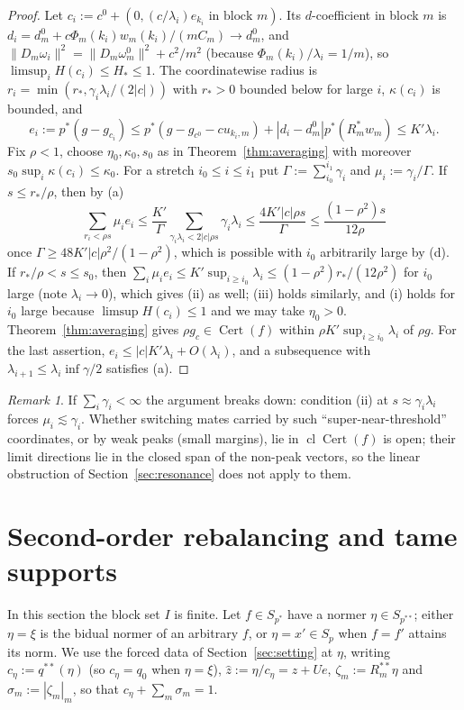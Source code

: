 \documentclass[10pt]{amsart}
\theoremstyle{definition}
\theoremstyle{remark}
\newtheorem{remark}[theorem]{Remark}
\newcommand{\Cert}{\operatorname{Cert}}
\newcommand{\cl}{\operatorname{cl}}
\newcommand{\zh}{\hat z}
\begin{document}
\begin{proof}
Let $c_i:=c^0+(0,(c/\lambda_i)e_{k_i}\text{ in block }m)$.  Its
$d$-coefficient in block $m$ is $d_{i}=d^0_m+c\Phi_m(k_i)w_m(k_i)/(mC_m)
\to d^0_m$, and $\|D_m\omega_{i}\|^2=\|D_m\omega^0_m\|^2+c^2/m^2$ (because
$\Phi_m(k_i)/\lambda_i=1/m$), so $\limsup_iH(c_i)\le H_*\le1$.  The
coordinatewise radius is $r_i=\min(r_*,\gamma_i\lambda_i/(2|c|))$ with
$r_*>0$ bounded below for large $i$, $\kappa(c_i)$ is bounded, and
\[
 e_i:=p^*(g-g_{c_i})\le p^*(g-g_{c^0}-cu_{k_i,m})+|d_i-d^0_m|p^*(R_m^*w_m)
 \le K'\lambda_i .
\]
Fix $\rho<1$, choose $\eta_0,\kappa_0,s_0$ as in Theorem~\ref{thm:averaging}
with moreover $s_0\sup_i\kappa(c_i)\le\kappa_0$.  For a stretch
$i_0\le i\le i_1$ put $\Gamma:=\sum_{i_0}^{i_1}\gamma_i$ and
$\mu_i:=\gamma_i/\Gamma$.  If $s\le r_*/\rho$, then by (a)
\[
 \sum_{r_i<\rho s}\mu_ie_i\le\frac{K'}{\Gamma}\sum_{\gamma_i\lambda_i<2|c|\rho
 s}\gamma_i\lambda_i\le\frac{4K'|c|\rho s}{\Gamma}\le\frac{(1-\rho^2)s}
 {12\rho}
\]
once $\Gamma\ge48K'|c|\rho^2/(1-\rho^2)$, which is possible with $i_0$
arbitrarily large by (d).  If $r_*/\rho<s\le s_0$, then
$\sum_i\mu_ie_i\le K'\sup_{i\ge i_0}\lambda_i\le(1-\rho^2)r_*/(12\rho^2)$
for $i_0$ large (note $\lambda_i\to0$), which gives (ii) as well; (iii) holds similarly, and (i) holds for
$i_0$ large because $\limsup H(c_i)\le1$ and we may take $\eta_0>0$.
Theorem~\ref{thm:averaging} gives $\rho g_c\in\Cert(f)$ within
$\rho K'\sup_{i\ge i_0}\lambda_i$ of $\rho g$.  For the last assertion,
$e_i\le|c|K'\lambda_i+O(\lambda_i)$, and a subsequence with
$\lambda_{i+1}\le\lambda_i\inf\gamma/2$ satisfies (a).
\end{proof}

\begin{remark}\label{rem:summablegaps}
If $\sum_i\gamma_i<\infty$ the argument breaks down: condition (ii) at
$s\approx\gamma_i\lambda_i$ forces $\mu_i\lesssim\gamma_i$.  Whether
switching mates carried by such ``super-near-threshold'' coordinates, or by
weak peaks (small margins), lie in $\cl\Cert(f)$ is open; their limit
directions lie in the closed span of the non-peak vectors, so the linear
obstruction of Section~\ref{sec:resonance} does not apply to them.
\end{remark}

\section{Second-order rebalancing and tame supports}\label{sec:second}

In this section the block set $I$ is finite.  Let $f\in S_{p^*}$ have a
normer $\eta\in S_{p^{**}}$; either $\eta=\xi$ is the bidual normer of an
arbitrary $f$, or $\eta=x'\in S_p$ when $f=f'$ attains its norm.  We use the
forced data of Section~\ref{sec:setting} at $\eta$, writing
$c_\eta:=q^{**}(\eta)$ (so $c_\eta=q_0$ when $\eta=\xi$),
$\zh:=\eta/c_\eta=z+Ue$, $\zeta_m:=R_m^{**}\eta$ and
$\sigma_m:=|\zeta_m|_m$, so that $c_\eta+\sum_m\sigma_m=1$.
\end{document}
